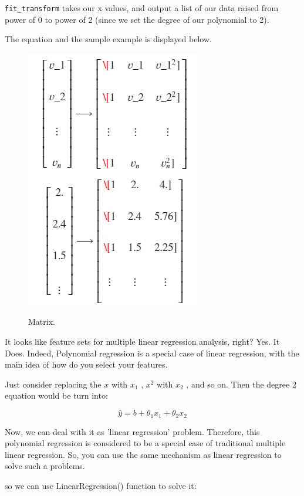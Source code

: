 	\verb|fit_transform| takes our x values, and output a list of our data raised from power of 0 to power of 2 (since we set the degree of our polynomial to 2).
	
	The equation and the sample example is displayed below.
	
		\begin{figure} 
		\caption{Matrix.}
		\centering
		\includegraphics[scale=0.5]{figures/W1-matrix.png}
		\label{W301c-clone}
	\end{figure}
	
	It looks like feature sets for multiple linear regression analysis, right? Yes. It Does. Indeed, Polynomial regression is a special case of linear regression, with the main idea of how do you select your features.
	
	Just consider replacing the  $x$  with  $x_{1}$ , $x^{2}$  with  $x_{2}$ , and so on. Then the degree 2 equation would be turn into:
	
	\begin{equation}
		\hat{y} = b + \theta_{1}x_{1} + \theta_{2}x_{2}
	\end{equation}

	Now, we can deal with it as 'linear regression' problem. Therefore, this polynomial regression is considered to be a special case of traditional multiple linear regression. So, you can use the same mechanism as linear regression to solve such a problems.
	
	so we can use LinearRegression() function to solve it:
	
